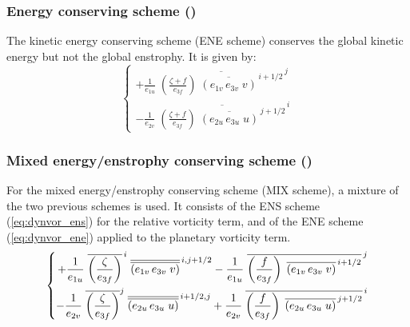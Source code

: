 \documentclass[../tex_main/NEMO_manual]{subfiles}
\begin{document}
\subsubsection{Energy conserving scheme (\protect{})}
\label{subsec:DYN_vor_ene}

The kinetic energy conserving scheme (ENE scheme) conserves the global 
kinetic energy but not the global enstrophy. It is given by:
\begin{equation} \label{eq:dynvor_ene}
\left\{   \begin{aligned}
{+\frac{1}{e_{1u}}\; {\overline {\left( {\frac{\zeta +f}{e_{3f} }} \right)
                            \;  \overline {\left( {e_{1v}\,e_{3v}\;v} \right)} ^{\,i+1/2}} }^{\,j} }    \\
{- \frac{1}{e_{2v}}\; {\overline {\left( {\frac{\zeta +f}{e_{3f} }} \right)
                            \;  \overline {\left( {e_{2u}\,e_{3u}\;u} \right)} ^{\,j+1/2}} }^{\,i} }
\end{aligned}    \right.
\end{equation} 

\subsubsection{Mixed energy/enstrophy conserving scheme (\protect{}) }
\label{subsec:DYN_vor_mix}

For the mixed energy/enstrophy conserving scheme (MIX scheme), a mixture of the 
two previous schemes is used. It consists of the ENS scheme (\autoref{eq:dynvor_ens}) 
for the relative vorticity term, and of the ENE scheme (\autoref{eq:dynvor_ene}) applied 
to the planetary vorticity term.
\begin{equation} \label{eq:dynvor_mix}
\left\{ {     \begin{aligned}
 {+\frac{1}{e_{1u} }\; {\overline {\left( {\frac{\zeta }{e_{3f} }} \right)} }^{\,i} 
 \; {\overline{\overline {\left( {e_{1v}\,e_{3v}\;v} \right)}} }^{\,i,j+1/2} -\frac{1}{e_{1u} }
 \; {\overline {\left( {\frac{f}{e_{3f} }} \right) 
 \;\overline {\left( {e_{1v}\,e_{3v}\;v} \right)} ^{\,i+1/2}} }^{\,j} } \\
{-\frac{1}{e_{2v} }\; {\overline {\left( {\frac{\zeta }{e_{3f} }} \right)} }^j
 \; {\overline{\overline {\left( {e_{2u}\,e_{3u}\;u} \right)}} }^{\,i+1/2,j} +\frac{1}{e_{2v} }
 \; {\overline {\left( {\frac{f}{e_{3f} }} \right)
 \;\overline {\left( {e_{2u}\,e_{3u}\;u} \right)} ^{\,j+1/2}} }^{\,i} } \hfill
\end{aligned}     } \right.
\end{equation} 
\end{document}

